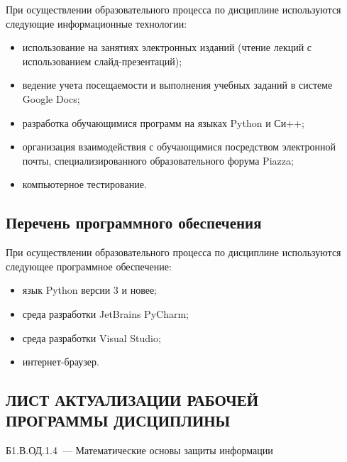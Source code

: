 \documentclass[a4paper,12pt]{article}
\begin{document}
При осуществлении образовательного процесса по дисциплине используются следующие информационные технологии:
\begin{itemize}[nolistsep]
  
\item использование на занятиях электронных изданий (чтение лекций с использованием слайд-презентаций);
  
\item ведение учета посещаемости и выполнения учебных заданий в системе Google Docs;
  
\item разработка обучающимися программ на языках Python и Си++;
  
\item организация взаимодействия с обучающимися посредством электронной почты, специализированного образовательного форума Piazza;
  
\item компьютерное тестирование.
  
\end{itemize}

\subsection{Перечень программного обеспечения}
При осуществлении образовательного процесса по дисциплине используются следующее программное обеспечение:
\begin{itemize}[nolistsep]
  
\item язык Python версии 3 и новее;
  
\item среда разработки JetBrains PyCharm;
  
\item среда разработки Visual Studio;
  
\item интернет-браузер.
  
\end{itemize}



\newpage
\begin{center}
\section*{ЛИСТ АКТУАЛИЗАЦИИ РАБОЧЕЙ ПРОГРАММЫ ДИСЦИПЛИНЫ}
Б1.В.ОД.1.4\ --- Математические основы защиты информации 
\end{center}
\end{document}
